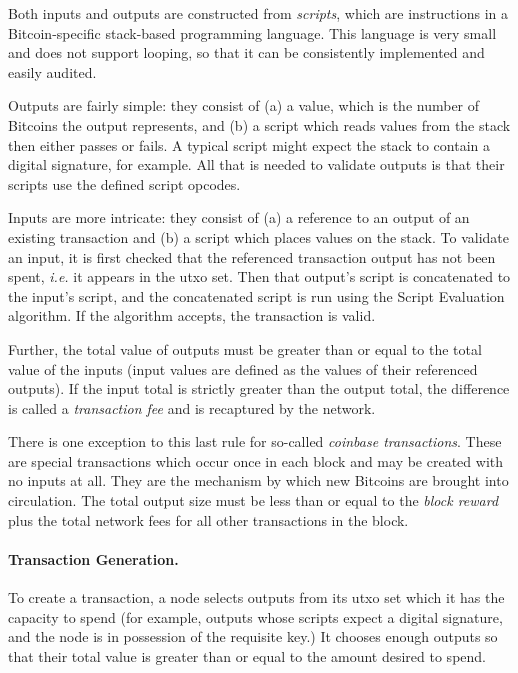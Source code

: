 \documentclass[letterpaper]{article}
\begin{document}
Both inputs and outputs are constructed from \emph{scripts}, which are
instructions in a Bitcoin-specific stack-based programming language.
This language is very small and does not support looping, so that it
can be consistently implemented and easily audited.
 
Outputs are fairly simple: they consist of (a) a value, which is the
number of Bitcoins the output represents, and (b) a script which reads
values from the stack then either passes or fails. A typical script
might expect the stack to contain a digital signature, for example.
All that is needed to validate outputs is that their scripts use the
defined script opcodes.

Inputs are more intricate: they consist of (a) a reference to an output
of an existing transaction and (b) a script which places values on the
stack. To validate an input, it is first checked that the referenced
transaction output has not been spent, \emph{i.e.} it appears in the
utxo set. Then that output's script is concatenated to the input's
script, and the concatenated script is run using the Script Evaluation
algorithm. If the algorithm accepts, the transaction is valid.

Further, the total value of outputs must be greater than or equal to
the total value of the inputs (input values are defined as the values
of their referenced outputs). If the input total is strictly greater
than the output total, the difference is called a \emph{transaction fee}
and is recaptured by the network.

There is one exception to this last rule for so-called \emph{coinbase
transactions}. These are special transactions which occur once in each
block and may be created with no inputs at all. They are the mechanism
by which new Bitcoins are brought into circulation. The total output
size must be less than or equal to the \emph{block reward} plus the
total network fees for all other transactions in the block.

\paragraph{Transaction Generation.} To create a transaction, a node
selects outputs from its utxo set which it has the capacity to spend
(for example, outputs whose scripts expect a digital signature, and
the node is in possession of the requisite key.) It chooses enough
outputs so that their total value is greater than or equal to the
amount desired to spend.
\end{document}
